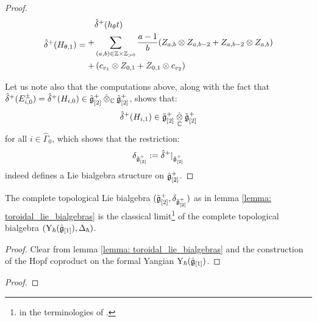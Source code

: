 \begin{proof}
                        $$
                            \hat{\delta}^+(H_{\theta, 1}) =
                            \begin{aligned}
                                & \hat{\delta}^+(h_{\theta} t)
                                \\
                                + & \sum_{(a, b) \in \Z \x \Z_{> 0}} \frac{a - 1}{b} ( Z_{a, b} \tensor Z_{a, b - 2} + Z_{a, b - 2} \tensor Z_{a, b} )
                                \\
                                + & \left( c_{v_1} \tensor Z_{0, 1} + Z_{0, 1} \tensor c_{v_2} \right)
                            \end{aligned}
                        $$
                        
                    Let us note also that the computations above, along with the fact that $\hat{\delta}^+(E_{i, 0}^{\pm}) = \hat{\delta}^+(H_{i, 0}) \in \tilde{\g}_{[2]}^+ \hattensor_{\bbC} \tilde{\g}_{[2]}^+$, shows that:
                        $$\hat{\delta}^+(H_{i, 1}) \in \tilde{\g}_{[2]}^+ \hattensor_{\bbC} \tilde{\g}_{[2]}^+$$
                    for all $i \in \hat{\Gamma}_0$, which shows that the restriction:
                        $$\delta_{\tilde{\mathfrak{g}}_{[2]}^+} := \hat{\delta}^+|_{\tilde{\mathfrak{g}}_{[2]}^+}$$
                    indeed defines a Lie bialgebra structure on $\tilde{\mathfrak{g}}_{[2]}^+$.
                \end{proof}
            \begin{theorem} \label{theorem: toroidal_lie_algebras_as_classical_limits_of_affine_yangians}
                The complete topological Lie bialgebra $(\tilde{\mathfrak{g}}_{[2]}^+, \delta_{\tilde{\mathfrak{g}}_{[2]}^+})$ as in lemma \ref{lemma: toroidal_lie_bialgebras} is the classical limit\footnote{ in the terminologies of \cite{etingof_kazhdan_quantisation_1}.} of the complete topological bialgebra $(\mathrm{Y}_{\hbar}(\hat{\mathfrak{g}}_{[1]}), \Delta_{\hbar})$.
            \end{theorem}
                \begin{proof}
                    Clear from lemma \ref{lemma: toroidal_lie_bialgebras} and the construction of the Hopf coproduct on the formal Yangian $\mathrm{Y}_{\hbar}(\hat{\mathfrak{g}}_{[1]})$. 
                \end{proof}
                
            \begin{definition} \label{def: parametrised_pseudo_quantisations}
                
            \end{definition}
            \begin{theorem} \label{theorem: parametrised_pseudo_classical_limits_of_affine_yangians}
                
            \end{theorem}
                \begin{proof}
                    
                \end{proof}

